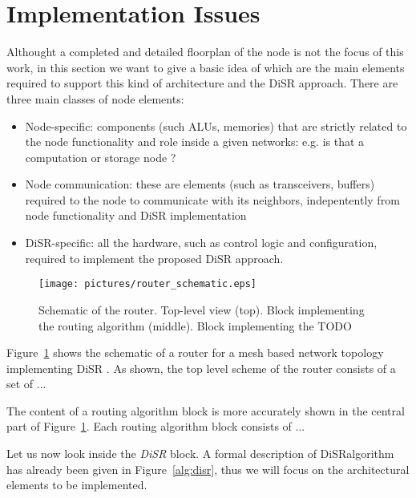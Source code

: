 
\section{Implementation Issues}
\label{sec:implementation}
Althought a completed and detailed floorplan of the node is not the
focus of this work, in this section we want to give a basic idea of
which are the main elements required to support this kind of
architecture and the DiSR approach. There are three main classes of
node elements:
\begin{itemize}
\item Node-specific: components (such ALUs, memories) that are
strictly related to the node functionality and role inside a given
networks: e.g. is that a computation or storage node ?
\item Node communication:  these are elements (such as transceivers,
buffers) required to the node to communicate with its neighbors,
indepentently from node functionality and DiSR implementation
\item DiSR-specific: all the hardware, such as control logic and
configuration, required to implement the proposed DiSR approach.
\end{itemize}

\begin{figure}
  \centering
  \texttt{[image: pictures/router\_schematic.eps]}
  \caption{Schematic of the router. Top-level view (top). Block
  implementing the routing algorithm (middle). Block implementing the
  TODO
  }
  \label{fig:schematic}
\end{figure}

Figure~\ref{fig:schematic} shows the schematic of a router for
a mesh based network topology implementing DiSR . As shown, the top level scheme of the router consists of a
set of ...

The content of a routing algorithm block is more accurately shown in
the central part of Figure~\ref{fig:schematic}. Each routing algorithm
block consists of ...

Let us now look inside the \emph{DiSR} block. A formal description of
DiSRalgorithm has already been given in Figure~\ref{alg:disr}, thus we
will focus on the architectural elements to be implemented.
	
